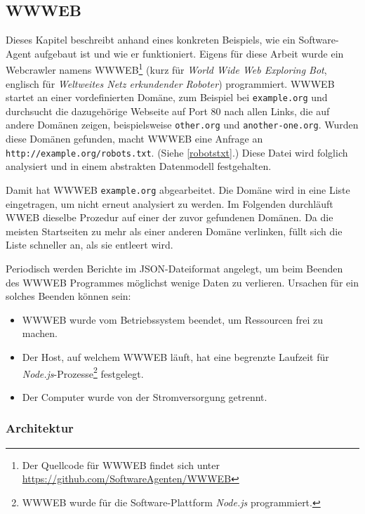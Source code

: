 \subsection{WWWEB}
\label{sub:wwweb}

Dieses Kapitel beschreibt anhand eines konkreten Beispiels, wie ein
Software-Agent aufgebaut ist und wie er funktioniert. Eigens für diese Arbeit
wurde ein Webcrawler namens WWWEB\footnote{Der Quellcode für WWWEB findet
sich unter \url{https://github.com/SoftwareAgenten/WWWEB}} (kurz für
\emph{World Wide Web Exploring Bot}, englisch für \emph{Weltweites Netz
erkundender Roboter}) programmiert. WWWEB startet an einer vordefinierten
Domäne, zum Beispiel bei \texttt{example.org} und durchsucht die dazugehörige
Webseite auf Port 80 nach allen Links, die auf andere Domänen zeigen,
beispielsweise \texttt{other.org} und \texttt{another-one.org}. Wurden diese
Domänen gefunden, macht WWWEB eine Anfrage an
\texttt{http://example.org/robots.txt}. (Siehe \ref{robotstxt}.) Diese Datei wird
folglich analysiert und in einem abstrakten Datenmodell festgehalten.

Damit hat WWWEB \texttt{example.org} abgearbeitet. Die Domäne wird in eine
Liste eingetragen, um nicht erneut analysiert zu werden. Im Folgenden
durchläuft WWEB dieselbe Prozedur auf einer der zuvor gefundenen Domänen. Da
die meisten Startseiten zu mehr als einer anderen Domäne verlinken, füllt sich
die Liste schneller an, als sie entleert wird.

Periodisch werden Berichte im JSON-Dateiformat angelegt, um beim Beenden des
WWWEB Programmes möglichst wenige Daten zu verlieren. Ursachen für ein solches
Beenden können sein:

\begin{itemize}
\item
  WWWEB wurde vom Betriebssystem beendet, um Ressourcen frei zu machen.
\item
  Der Host, auf welchem WWWEB läuft, hat eine begrenzte Laufzeit für
  \emph{Node.js}-Prozesse\footnote{WWWEB wurde für die Software-Plattform
  \emph{Node.js} programmiert.} festgelegt.
\item
  Der Computer wurde von der Stromversorgung getrennt.
\end{itemize}

\subsubsection{Architektur}
\label{ssub:wwweb_architektur}

